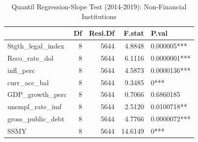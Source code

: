 \begin{table}[ht]
\centering
\caption{Quantil Regression-Slope Test (2014-2019): Non-Financial Institutions} 
\begingroup\small
\begin{tabular}{lrrrl}
  \toprule
 & Df & Resi.Df & F.stat & P.val \\ 
  \midrule
Stgth\_legal\_index & 8 & 5644 & 4.8848 & 0.000005*** \\ 
  Reco\_rate\_dol & 8 & 5644 & 6.1116 & 0.0000001*** \\ 
  infl\_perc & 8 & 5644 & 4.5873 & 0.0000136*** \\ 
  curr\_acc\_bal & 8 & 5644 & 9.3485 & 0*** \\ 
  GDP\_growth\_perc & 8 & 5644 & 0.7066 & 0.6860185 \\ 
  unempl\_rate\_imf & 8 & 5644 & 2.5120 & 0.0100718** \\ 
  gross\_public\_debt & 8 & 5644 & 4.7766 & 0.0000072*** \\ 
  SSMY & 8 & 5644 & 14.6149 & 0*** \\ 
   \bottomrule
\end{tabular}
\endgroup
\end{table}
